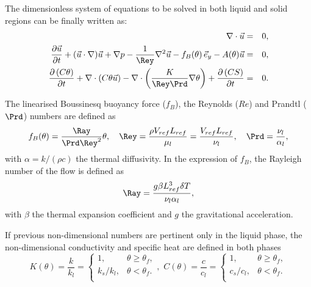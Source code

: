 The dimensionless system of equations to be solved in both liquid and solid regions can be finally written as:
\begin{eqnarray}
\nabla\cdot \vec{u}&=&0, \label{eq-qmvt} \\ \vspace{0.2cm}
 \frac{\partial \vec{u}}{\partial t} + {(\vec{u}\cdot\nabla) \vec{u}} +\nabla p -\frac{1}{\Rey}{\nabla^2 \vec{u}} 
 - f_B(\theta)\, \vec{e}_y - A(\theta) \vec{u}&=&0, \label{eq-qmvt-2} \\ \vspace{0.2cm}
 \frac{\partial \left(C \theta\right)}{\partial t} + \nabla \cdot\left( C \theta \vec{u}\right) -
 \nabla \cdot\left( \frac{K}{\Rey \Prd} \nabla \theta \right) +  \frac{\partial \left(C S\right)}{\partial t}  &=& 0. \label{eq-energ} 
\end{eqnarray}

\noindent The linearised Boussinesq buoyancy force ($f_B$), the Reynolds ($Re$) and Prandtl ($\Prd$) numbers are defined as
\begin{equation}\label{eq-RePr}
f_B(\theta) = \frac{\Ray}{\Prd \Rey^2} \theta, \quad \Rey = \frac{\rho V_{ref} L_{ref}}{\mu_l}=  \frac{V_{ref} L_{ref}}{\nu_l} , \quad \Prd = \frac{\nu_l}{\alpha_l},
\end{equation}
with $\alpha = k/(\rho c)$  the thermal diffusivity. In the expression of $f_B$, the Rayleigh number of the flow is defined as
\begin{equation}
\label{eq-Rayleigh}
\Ray = \frac{g \beta L_{ref}^3 \delta T}{\nu_l \alpha_l},
\end{equation}
with $\beta$ the thermal expansion coefficient and $g$ the gravitational acceleration.

\noindent If previous non-dimensional numbers are pertinent only in the liquid phase, the non-dimensional conductivity and specific heat are  defined in both phases
\begin{equation}\label{eq-adimKC}
K(\theta)= \frac{k}{k_l} =\left\{
\begin{matrix}
1, & \theta \geq \theta_f ,\\
k_s/k_l, & \theta < \theta_f .\\
\end{matrix}
\right.
, \,  \, C(\theta) = \frac{c}{c_l}=\left\{
\begin{matrix}
1, & \theta \geq \theta_f ,\\
c_s/c_l, & \theta < \theta_f .\\
\end{matrix}
\right.
\end{equation}

